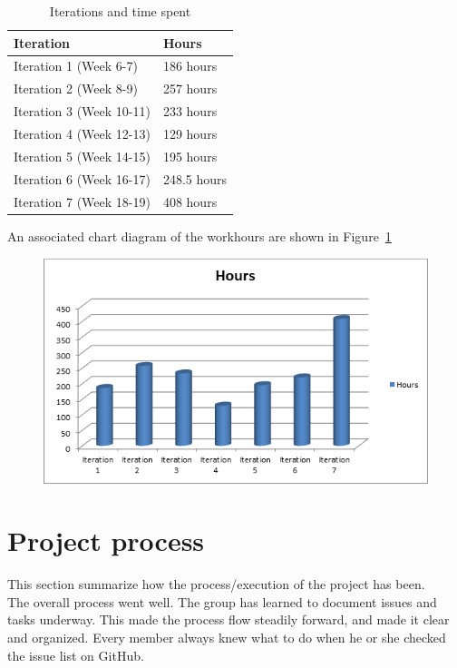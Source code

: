 	\begin{table}[H]
	\caption{Iterations and time spent}
	\centering
	\label{table:workhours}
	\begin{tabular}{|l|l|}
		\hline
			{\bf Iteration} & {\bf Hours}\\
		\hline
			Iteration 1 (Week 6-7) & 186 hours\\
		\hline
			Iteration 2 (Week 8-9) & 257 hours\\
		\hline
			Iteration 3 (Week 10-11) & 233 hours\\
		\hline
			Iteration 4 (Week 12-13) & 129 hours\\
		\hline
			Iteration 5 (Week 14-15) & 195 hours\\
		\hline
			Iteration 6 (Week 16-17) & 248.5 hours\\
		\hline
			Iteration 7 (Week 18-19) & 408 hours\\
		\hline
	\end{tabular}
	\end{table}

	An associated chart diagram of the workhours are shown in Figure~\ref{fig:workhours}

	\begin{figure}[H]
	\centering
	\label{fig:workhours}
	\includegraphics[scale=0.8]{images/workhours_chart2.png}
	\end{figure}



	\section{Project process}
	This section summarize how the process/execution of the project has been.\\
	The overall process went well. The group has learned to document issues and tasks underway. This made the process flow steadily forward, and made it clear and organized. Every member always knew what to do when he or she checked the issue list on GitHub.

